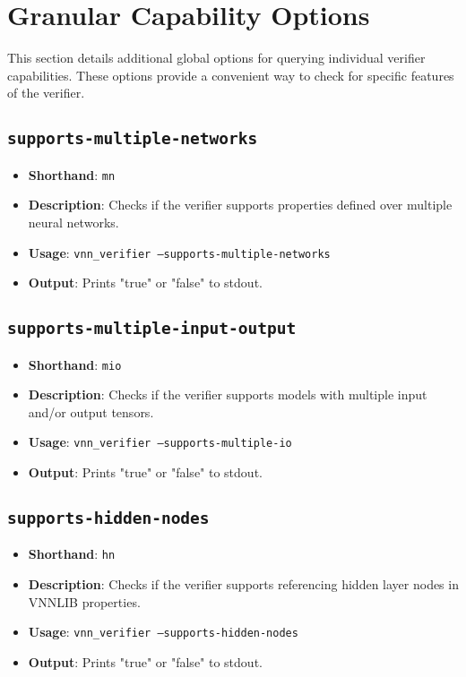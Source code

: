 
\section{Granular Capability Options}
This section details additional global options for querying individual verifier capabilities. These options provide a convenient way to check for specific features of the verifier.

\subsection{\texttt{supports-multiple-networks}}
\begin{itemize}
    \item \textbf{Shorthand}: \texttt{mn}
    \item \textbf{Description}: Checks if the verifier supports properties defined over multiple neural networks. 
    \item \textbf{Usage}: \texttt{vnn\_verifier --supports-multiple-networks}
    \item \textbf{Output}: Prints "true" or "false" to stdout.
\end{itemize}

\subsection{\texttt{supports-multiple-input-output}}
\begin{itemize}
    \item \textbf{Shorthand}: \texttt{mio}
    \item \textbf{Description}: Checks if the verifier supports models with multiple input and/or output tensors. 
    \item \textbf{Usage}: \texttt{vnn\_verifier --supports-multiple-io}
    \item \textbf{Output}: Prints "true" or "false" to stdout.
\end{itemize}

\subsection{\texttt{supports-hidden-nodes}}
\begin{itemize}
    \item \textbf{Shorthand}: \texttt{hn}
    \item \textbf{Description}: Checks if the verifier supports referencing hidden layer nodes in VNNLIB properties. 
    \item \textbf{Usage}: \texttt{vnn\_verifier --supports-hidden-nodes}
    \item \textbf{Output}: Prints "true" or "false" to stdout.
\end{itemize}

